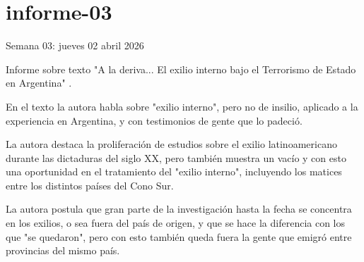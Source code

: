 \documentclass[./informes.tex]{subfiles}
\begin{document}
\chapter{informe-03}

Semana 03: jueves 02 abril 2026

Informe sobre texto "A la deriva... El exilio interno bajo el Terrorismo de Estado en Argentina" \cite{derivaCasola}.

En el texto la autora habla sobre "exilio interno", pero no de insilio, aplicado a la experiencia en Argentina, y con testimonios de gente que lo padeció.

La autora destaca la proliferación de estudios sobre el exilio latinoamericano durante las dictaduras del siglo XX, pero también muestra un vacío y con esto una oportunidad en el tratamiento del "exilio interno", incluyendo los matices entre los distintos países del Cono Sur.

La autora postula que gran parte de la investigación hasta la fecha se concentra en los exilios, o sea fuera del país de origen, y que se hace la diferencia con los que "se quedaron", pero con esto también queda fuera la gente que emigró entre provincias del mismo país.




\printbibliography[
  heading=subbibliography
]
\end{document}
